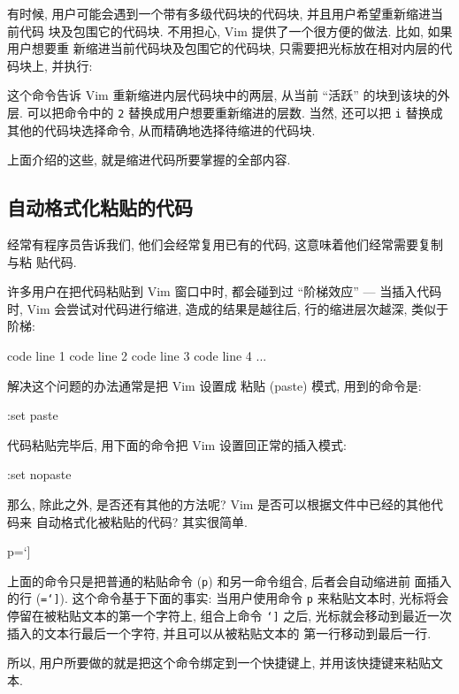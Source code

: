 有时候, 用户可能会遇到一个带有多级代码块的代码块, 并且用户希望重新缩进当前代码
块及包围它的代码块. 不用担心, Vim 提供了一个很方便的做法. 比如, 如果用户想要重
新缩进当前代码块及包围它的代码块, 只需要把光标放在相对内层的代码块上, 并执行:
\begin{vimcode}
=2i{
\end{vimcode}
这个命令告诉 Vim 重新缩进内层代码块中的两层, 从当前 ``活跃'' 的块到该块的外层.
可以把命令中的 \texttt{2} 替换成用户想要重新缩进的层数. 当然, 还可以把
\texttt{i} 替换成其他的代码块选择命令, 从而精确地选择待缩进的代码块.

上面介绍的这些, 就是缩进代码所要掌握的全部内容.

\subsection{自动格式化粘贴的代码}
\label{subsec:auto_format_pasted_code}

经常有程序员告诉我们, 他们会经常复用已有的代码, 这意味着他们经常需要复制与粘
贴代码.

许多用户在把代码粘贴到 Vim 窗口中时, 都会碰到过 ``阶梯效应'' --- 当插入代码时,
Vim 会尝试对代码进行缩进, 造成的结果是越往后, 行的缩进层次越深, 类似于阶梯:
\begin{vimcode}
code line 1
    code line 2
        code line 3
            code line 4
               ...
\end{vimcode}
解决这个问题的办法通常是把 Vim 设置成 粘贴 (paste) 模式, 用到的命令是:
\begin{vimcode}
:set paste
\end{vimcode}
代码粘贴完毕后, 用下面的命令把 Vim 设置回正常的插入模式:
\begin{vimcode}
:set nopaste
\end{vimcode}

那么, 除此之外, 是否还有其他的方法呢? Vim 是否可以根据文件中已经的其他代码来
自动格式化被粘贴的代码? 其实很简单.
\begin{vimcode}
p=`]
\end{vimcode}
上面的命令只是把普通的粘贴命令 (\texttt{p}) 和另一命令组合, 后者会自动缩进前
面插入的行 (\texttt{=`]}). 这个命令基于下面的事实: 当用户使用命令 \texttt{p}
来粘贴文本时, 光标将会停留在被粘贴文本的第一个字符上, 组合上命令 \texttt{`]}
之后, 光标就会移动到最近一次插入的文本行最后一个字符, 并且可以从被粘贴文本的
第一行移动到最后一行.

所以, 用户所要做的就是把这个命令绑定到一个快捷键上, 并用该快捷键来粘贴文本.
